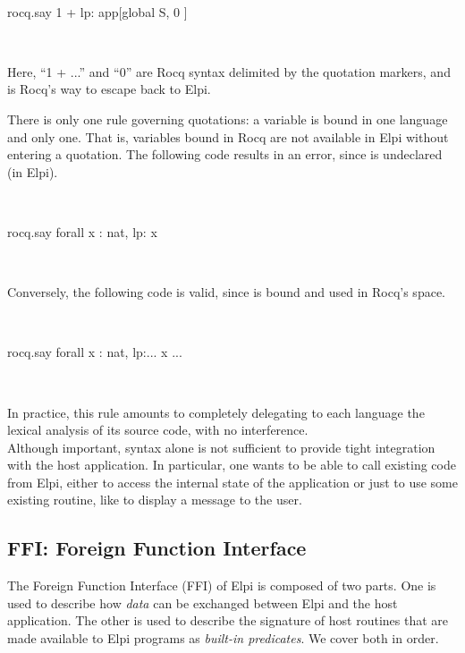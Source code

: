 \documentclass[a4paper, 11pt]{book}
\newenvironment{elpicode}
  {\VerbatimEnvironment~\\\begin{elpibox}\begin{xelpicode}}{\end{xelpicode}
\end{elpibox}\\}
\begin{document}
\begin{elpicode}
  rocq.say {{ 1 + lp:{{ app[global S, {{ 0  }} ]  }}    }}
\end{elpicode}

\noindent
Here, ``1 + ...'' and ``0'' are Rocq syntax delimited by the quotation
markers, and  is Rocq's way to escape back to Elpi.


There is only one rule governing quotations: a variable is bound in one language and only one. That
is, variables bound in Rocq are not available in Elpi without entering a
quotation. The following code results in an error, since  is undeclared
(in Elpi).

\begin{elpicode}
  rocq.say {{ forall x : nat, lp:{{ x }} }}
\end{elpicode}


\noindent
Conversely, the following code is valid, since  is bound and used in
Rocq's space.

\begin{elpicode}
  rocq.say {{ forall x : nat, lp:{{... {{ x }} ...}} }}
\end{elpicode}


\noindent
In practice, this rule amounts to completely delegating to each language the
lexical analysis of its source code, with no interference.
~\\

Although important, syntax alone is not sufficient to provide tight integration with the host
application. In particular, one wants to be able to call existing code from
Elpi, either to access the internal state of the application or just to use
some existing routine, like  to display a message to the user.


\subsection{FFI: Foreign Function Interface}\label{FFI}

The Foreign Function Interface (FFI) of Elpi is composed of two parts. One is
used to describe how \emph{data} can be exchanged between Elpi and the host
application. The other is used to describe the signature of host routines that
are made available to Elpi programs as \emph{built-in predicates}. We cover
both in order.
\end{document}
